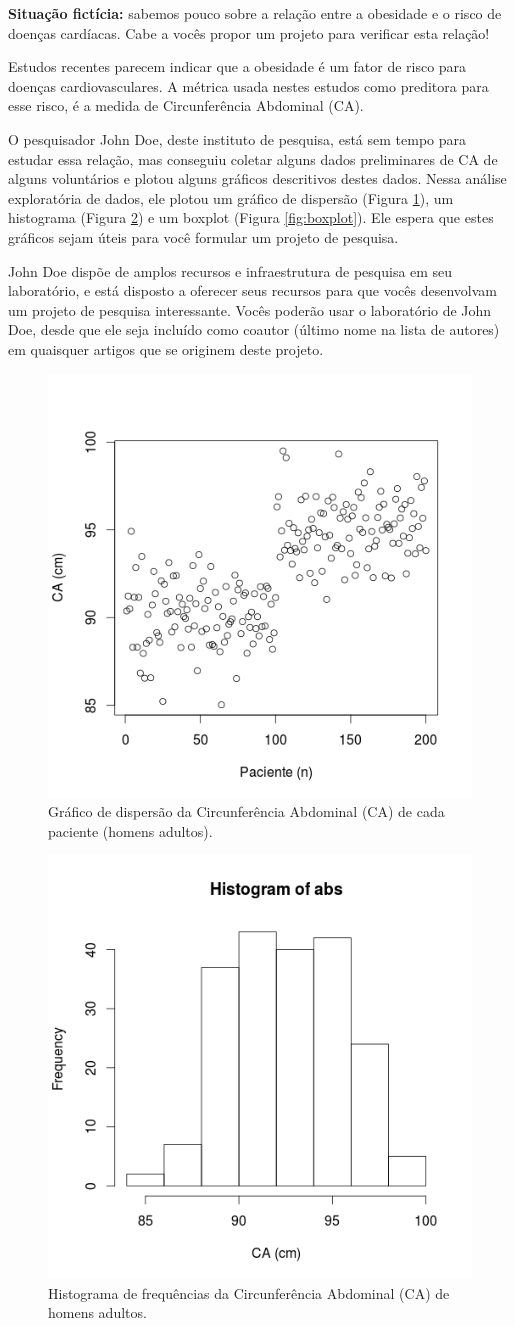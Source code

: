 \documentclass[a4paper]{article}
\begin{document}
{\bf Situação fictícia:} sabemos pouco sobre a relação entre a
obesidade e o risco de doenças cardíacas. Cabe a vocês propor um
projeto para verificar esta relação!

Estudos recentes parecem indicar que a obesidade é um fator de risco
para doenças cardiovasculares. A métrica usada nestes estudos como
preditora para esse risco, é a medida de Circunferência Abdominal
(CA).

O pesquisador John Doe, deste instituto de pesquisa, está sem tempo
para estudar essa relação, mas conseguiu coletar alguns dados
preliminares de CA de alguns voluntários e plotou alguns gráficos
descritivos destes dados. Nessa análise exploratória de dados, ele
plotou um gráfico de dispersão (Figura \ref{fig:dispersao}), um
histograma (Figura \ref{fig:histograma}) e um boxplot (Figura
\ref{fig:boxplot}). Ele espera que estes gráficos sejam úteis para
você formular um projeto de pesquisa.

John Doe dispõe de amplos recursos e infraestrutura de pesquisa em
seu laboratório, e está disposto a oferecer seus recursos para que
vocês desenvolvam um projeto de pesquisa interessante. Vocês poderão
usar o laboratório de John Doe, desde que ele seja incluído como
coautor (último nome na lista de autores) em quaisquer artigos que se
originem deste projeto.

\begin{figure}[h]
  \centering
  \includegraphics[width=.5\textwidth]{dispersao}
  \caption{Gráfico de dispersão da Circunferência Abdominal (CA) de
    cada paciente (homens adultos).}
  \label{fig:dispersao}
\end{figure}

\begin{figure}[h]
  \centering
  \includegraphics[width=.5\textwidth]{histograma}
  \caption{Histograma de frequências da Circunferência Abdominal (CA)
    de homens adultos.}
  \label{fig:histograma}
\end{figure}
\end{document}
